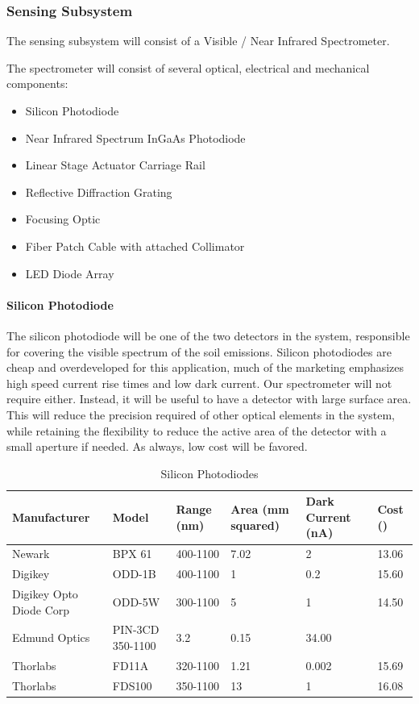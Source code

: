 \subsubsection{Sensing Subsystem}

The sensing subsystem will consist of a Visible / Near Infrared Spectrometer.

The spectrometer will consist of several optical, electrical and mechanical components:
    \begin{itemize}
        \item Silicon Photodiode
        \item Near Infrared Spectrum InGaAs Photodiode
        \item Linear Stage Actuator Carriage Rail
        \item Reflective Diffraction Grating
        \item Focusing Optic
        \item Fiber Patch Cable with attached Collimator
        \item LED Diode Array
    \end{itemize}

	\paragraph{Silicon Photodiode}

	The silicon photodiode will be one of the two detectors in the system, responsible for covering the visible spectrum of the soil emissions. Silicon photodiodes are cheap and overdeveloped for this application, much of the marketing emphasizes high speed current rise times and low dark current. Our spectrometer will not require either. Instead, it will be useful to have a detector with large surface area. This will reduce the precision required of other optical elements in the system, while retaining the flexibility to reduce the active area of the detector with a small aperture if needed. As always, low cost will be favored.


\begin{table}[H]
	\centering
	\label{table:SiliconPhotodiodes}
	\caption{Silicon Photodiodes}
	\begin{tabular}{|l|l|l|l|l|l|}
	\hline
	Manufacturer & Model & Range (nm) & Area (mm squared) & Dark Current (nA) & Cost (\textdollar)\\
    \hline
	Newark & BPX 61 & 400-1100 & 7.02 & 2 & 13.06\\
    \hline
	Digikey & ODD-1B & 400-1100 & 1 & 0.2 & 15.60\\
    \hline
	Digikey Opto Diode Corp & ODD-5W & 300-1100 & 5 & 1 & 14.50\\
    \hline
	Edmund Optics & PIN-3CD	350-1100 & 3.2 & 0.15 & 34.00\\
    \hline
	Thorlabs & FD11A & 320-1100 & 1.21 & 0.002 & 15.69\\
    \hline
	Thorlabs & FDS100 & 350-1100 & 13 & 1 & 16.08\\
    \hline
	\end{tabular}
\end{table}


